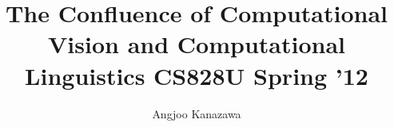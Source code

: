 \newcommand{\sig}{\sigma}
\newcommand{\eps}{\epsilon}
\newcommand{\del}{\delta}
\newcommand{\ah}{\alpha}
\newcommand{\lam}{\lambda}
\newcommand{\gam}{\gamma}
\newcommand{\kap}{\kappa}
\newcommand{\rarr}{\rightarrow}
\newcommand{\larr}{\leftarrow}
\newcommand{\ol}{\overline}
\newcommand{\mbb}{\mathbb}
\newcommand{\contra}{\Rightarrow\Leftarrow}
\newcommand{\lc}{\langle} %
\newcommand{\rc}{\rangle} %

\newcommand{\ben}{\begin{enumerate}}
\newcommand{\een}{\end{enumerate}}
\newcommand{\beq}{\begin{quote}}
\newcommand{\enq}{\end{quote}}
\newcommand{\hsone}{\hspace*{1cm}}
\newcommand{\hstwo}{\hspace*{2cm}}

\newcommand{\noi}{\noindent}
\parskip 5pt
\parindent 0pt

\documentclass[a4paper]{article}
\usepackage{amsmath,amssymb,algorithmic}

\title{The Confluence of Computational Vision and Computational Linguistics  CS828U Spring '12}
\author{Angjoo Kanazawa}
\maketitle

\section{January 30th Class 1}
\textbf{Perception vs Language}
Perception is to understand the world through signals. Understanding
is recursive, because you only understand in respect to something
else. When does it stop? 

Perception is a set of algorithms that are operating on a system. What
do they do? The experts can't agree.

David Marr said the goal of perception is to assign labels to objects
in the data. Lead to the field of Computer Vision. This hasn't gone anywhere because there's no interaction with the world.

Difference bewteen perception and understanding: human can perceive
and relate the situation with a set of symbols in his head (the goat,
monkey, ed, tom and the mars bar).

We may never know how animals perceive the world, the contexted needed
to relate with the world. 


 
